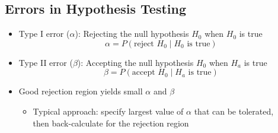 \documentclass[a4paper]{article}
\begin{document}
\subsection{Errors in Hypothesis Testing}
\begin{itemize}
    \item Type I error ($\alpha$): Rejecting the null hypothesis $H_{0}$ when $H_{0}$ is true
        $$\alpha = P(\text{reject }H_{0}\mid H_{0}\text{ is true})$$
    \item Type II error ($\beta$): Accepting the null hypothesis $H_{0}$ when $H_{a}$ is true
        $$\beta= P(\text{accept }H_{0}\mid H_{a}\text{ is true})$$
    \item Good rejection region yields small $\alpha$ and $\beta$
    \begin{itemize}[label=$\circ$]
        \item Typical approach: specify largest value of $\alpha$ that can be tolerated,\\then back-calculate for the rejection region
    \end{itemize}
\end{itemize}
\end{document}
